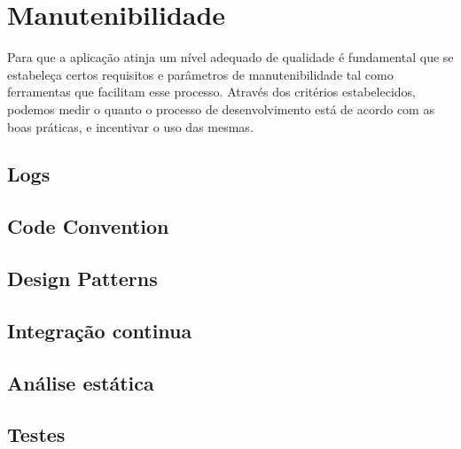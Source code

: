 \section{Manutenibilidade}
Para que a aplicação atinja um nível adequado de qualidade é fundamental
que se estabeleça certos requisitos e parâmetros de manutenibilidade tal como
ferramentas que facilitam esse processo. Através dos critérios estabelecidos, podemos
medir o quanto o processo de desenvolvimento está de acordo com as boas práticas, e incentivar o uso das mesmas.

\subsection{Logs}

\subsection{Code Convention}

\subsection{Design Patterns}

\subsection{Integração continua}

\subsection{Análise estática}

\subsection{Testes}